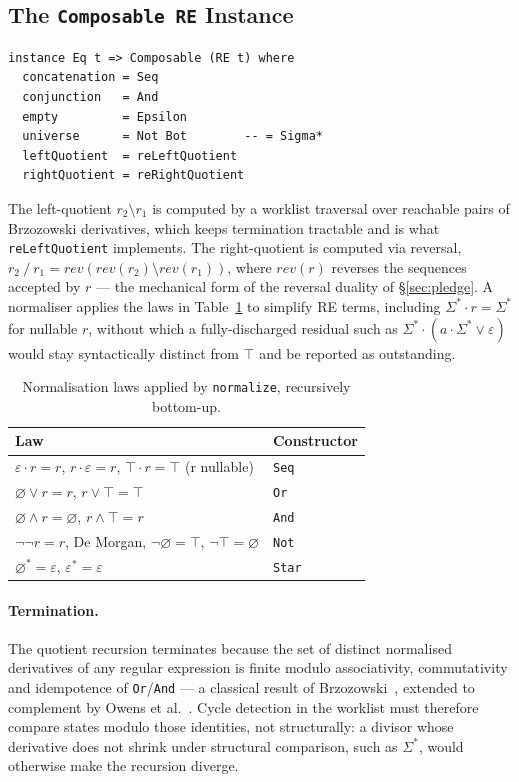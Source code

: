 \documentclass[acmsmall,screen]{acmart}
\newcommand{\lquot}{\mathbin{\setminus}}   %
\newcommand{\rquot}{\mathbin{/}}           %
\begin{document}
\subsection{The \texttt{Composable RE} Instance}
\label{sec:composable-re}

\begin{lstlisting}
instance Eq t => Composable (RE t) where
  concatenation = Seq
  conjunction   = And
  empty         = Epsilon
  universe      = Not Bot        -- = Sigma*
  leftQuotient  = reLeftQuotient
  rightQuotient = reRightQuotient
\end{lstlisting}
The left-quotient $r_2 \lquot r_1$ is computed by a worklist traversal over
reachable pairs of Brzozowski derivatives, which keeps termination
tractable and is what \lstinline{reLeftQuotient} implements.
The right-quotient is computed via reversal,
$r_2 \rquot r_1 = \mathit{rev}(\mathit{rev}(r_2) \lquot \mathit{rev}(r_1))$,
where $\mathit{rev}(r)$ reverses the sequences accepted by $r$ --- the
mechanical form of the reversal duality of \S\ref{sec:pledge}.
A normaliser applies the laws in Table~\ref{tab:normalize-laws} to simplify
RE terms, including $\Sigma^* \cdot r = \Sigma^*$ for nullable $r$, without
which a fully-discharged residual such as $\Sigma^* \cdot (a \cdot \Sigma^*
\vee \varepsilon)$ would stay syntactically distinct from $\top$ and be
reported as outstanding.

\begin{table}[ht]
\caption{Normalisation laws applied by \lstinline{normalize}, recursively
         bottom-up.}
\label{tab:normalize-laws}
\begin{tabular}{ll}
\toprule
Law & Constructor \\
\midrule
$\varepsilon \cdot r = r$, $r \cdot \varepsilon = r$, $\top\!\cdot\!r = \top$ (r nullable) & \lstinline{Seq} \\
$\varnothing \vee r = r$, $r \vee \top = \top$ & \lstinline{Or} \\
$\varnothing \wedge r = \varnothing$, $r \wedge \top = r$ & \lstinline{And} \\
$\neg\neg r = r$, De Morgan, $\neg\varnothing = \top$, $\neg\top = \varnothing$ & \lstinline{Not} \\
$\varnothing^* = \varepsilon$, $\varepsilon^* = \varepsilon$ & \lstinline{Star} \\
\bottomrule
\end{tabular}
\end{table}

\paragraph{Termination.}
The quotient recursion terminates because the set of distinct normalised
derivatives of any regular expression is finite modulo associativity,
commutativity and idempotence of \lstinline{Or}/\lstinline{And} --- a
classical result of Brzozowski~\cite{brzozowski1964}, extended to
complement by Owens et al.~\cite{owens2009}.
Cycle detection in the worklist must therefore compare states modulo those
identities, not structurally: a divisor whose derivative does not shrink
under structural comparison, such as $\Sigma^*$, would otherwise make the
recursion diverge.
\end{document}
